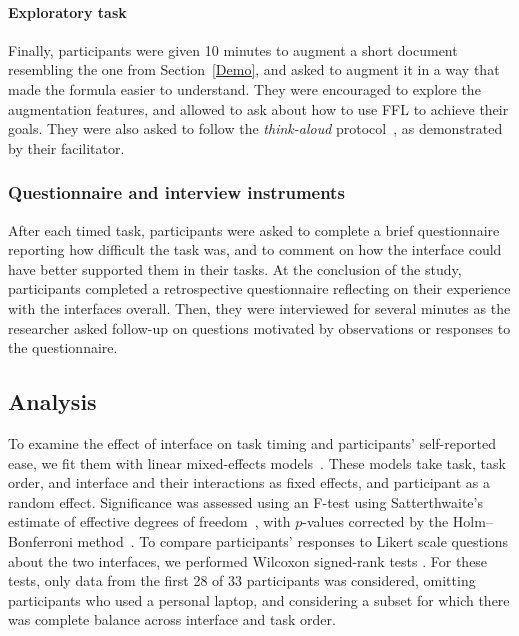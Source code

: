 

\paragraph{Exploratory task} Finally, participants were given 10 minutes to augment a short document resembling the one from Section~\ref{Demo}, and asked to augment it in a way that made the formula easier to understand. They were encouraged to explore the augmentation features, and allowed to ask about how to use FFL to achieve their goals. They were also asked to follow the \textit{think-aloud} protocol~\cite{think-aloud}, as demonstrated by their facilitator. %

\subsubsection{Questionnaire and interview instruments}
After each timed task, participants were asked to complete a brief questionnaire reporting how difficult the task was, and to comment on how the interface could have better supported them in their tasks. At the conclusion of the study, participants completed a retrospective questionnaire reflecting on their experience with the interfaces overall. Then, they were interviewed for several minutes as the researcher asked follow-up on questions motivated by observations or responses to the questionnaire.

\subsection{Analysis}\label{Analysis}
To examine the effect of interface on task timing and participants' self-reported ease, we fit them with linear mixed-effects models~\cite{LmmR}. These models take task, task order, and interface and their interactions as fixed effects, and participant as a random effect. Significance was assessed using an F-test using Satterthwaite's estimate of effective degrees of freedom~\cite{Satterthwaite}, with $p$-values corrected by the Holm–Bonferroni method~\cite{Holm}. To compare participants' responses to Likert scale questions about the two interfaces, we performed Wilcoxon signed-rank tests \cite{Wilcoxon}. For these tests, only data from the first 28 of 33 participants was considered, omitting participants who used a personal laptop, and considering a subset for which there was complete balance across interface and task order.

